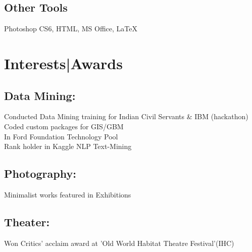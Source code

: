\documentclass[]{deedy-resume-openfont}
\begin{document}
\begin{minipage}[t]{0.33\textwidth}
\subsection{Other Tools}
Photoshop CS6, HTML, MS Office, \LaTeX\\
\sectionsep


\section{Interests|Awards}
\subsection{Data Mining:}
Conducted Data Mining training for Indian Civil Servants \& IBM (hackathon)\\
Coded custom packages for GIS/GBM\\
In Ford Foundation Technology Pool\\
Rank holder in Kaggle NLP Text-Mining\\
\sectionsep

\subsection{Photography:}
Minimalist works featured in Exhibitions \\
\sectionsep

\subsection{Theater:}
Won Critics' acclaim award at 'Old World Habitat Theatre Festival'(IHC)\\
\sectionsep



%
%

\end{minipage}
\end{document}
